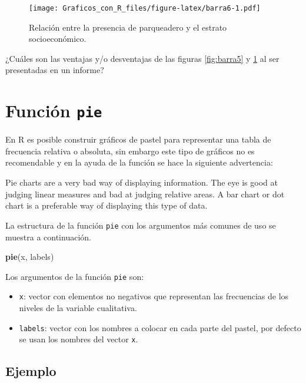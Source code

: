 \documentclass[10pt,]{krantz}
\makeatletter
\newenvironment{Shaded}{\begin{snugshade}}{\end{snugshade}}
\newcommand{\KeywordTok}[1]{\textcolor[rgb]{0.13,0.29,0.53}{\textbf{{#1}}}}
\newcommand{\NormalTok}[1]{{#1}}
\providecommand{\tightlist}{%
  \setlength{\itemsep}{0pt}\setlength{\parskip}{0pt}}
\let\proglang=\textsf
\newenvironment{kframe}{%
\medskip{}
\setlength{\fboxsep}{.8em}
 \def\at@end@of@kframe{}%
 \ifinner\ifhmode%
  \def\at@end@of@kframe{\end{minipage}}%
  \begin{minipage}{\columnwidth}%
 \fi\fi%
 \def\FrameCommand##1{\hskip\@totalleftmargin \hskip-\fboxsep
 \colorbox{shadecolor}{##1}\hskip-\fboxsep
     \hskip-\linewidth \hskip-\@totalleftmargin \hskip\columnwidth}%
 \MakeFramed {\advance\hsize-\width
   \@totalleftmargin\z@ \linewidth\hsize
   \@setminipage}}%
 {\par\unskip\endMakeFramed%
 \at@end@of@kframe}
\renewenvironment{Shaded}{\begin{kframe}}{\end{kframe}}
\let\BeginKnitrBlock\begin \let\EndKnitrBlock\end
\makeatother
\begin{document}
\begin{figure}[htbp]
\centering
\texttt{[image: Graficos\_con\_R\_files/figure-latex/barra6-1.pdf]}
\caption{\label{fig:barra6}Relación entre la presencia de parqueadero y el
estrato socioeconómico.}
\end{figure}

¿Cuáles son las ventajas y/o desventajas de las figuras \ref{fig:barra5}
y \ref{fig:barra6} al ser presentadas en un informe?

\section{\texorpdfstring{Función \texttt{pie} 
}{Función pie  }}\label{funcion-pie}

En \proglang{R} es posible construir gráficos de pastel para representar
una tabla de frecuencia relativa o absoluta, sin embargo este tipo de
gráficos no es recomendable y en la ayuda de la función se hace la
siguiente advertencia:

\BeginKnitrBlock{rmdwarning}
Pie charts are a very bad way of displaying information. The eye is good
at judging linear measures and bad at judging relative areas. A bar
chart or dot chart is a preferable way of displaying this type of data.
\EndKnitrBlock{rmdwarning}

La estructura de la función \texttt{pie} con los argumentos más comunes
de uso se muestra a continuación.

\begin{Shaded}
\begin{Highlighting}[]
\KeywordTok{pie}\NormalTok{(x, labels)}
\end{Highlighting}
\end{Shaded}

Los argumentos de la función \texttt{pie} son:

\begin{itemize}
\tightlist
\item
  \texttt{x}: vector con elementos no negativos que representan las
  frecuencias de los niveles de la variable cualitativa.
\item
  \texttt{labels}: vector con los nombres a colocar en cada parte del
  pastel, por defecto se usan los nombres del vector \texttt{x}.
\end{itemize}

\subsection*{Ejemplo}\label{ejemplo-21}
\end{document}
